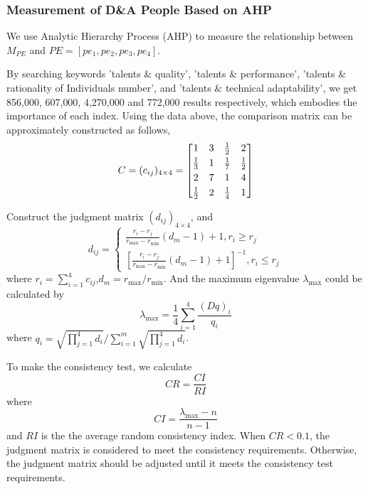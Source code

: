 \documentclass{mcmthesis}
\begin{document}
\subsubsection{Measurement of D\&A People Based on AHP}
We use Analytic Hierarchy Process (AHP) to measure the relationship between $M_{PE}$ and $PE = [pe_1,pe_2,pe_3,pe_4]$.

By searching keywords 'talents \& quality', 'talents \& performance', 'talents \& rationality of Individuals number', and 'talents \& technical adaptability', we get 856{,}000, 607{,}000, 4{,}270{,}000 and 772{,}000 results respectively, which embodies the importance of each index. Using the data above, the comparison matrix can be approximately constructed as follows,
\begin{equation}
    \setlength{\arraycolsep}{5pt}
    C = (c_{ij})_{4 \times 4} = \begin{bmatrix}
    1 & 3 & \frac{1}{2} & 2\\[1mm]
    \frac{1}{3} & 1 & \frac{1}{7} & \frac{1}{2} \\[1mm]
    2 & 7 & 1 & 4 \\[1mm]
    \frac{1}{2} & 2 & \frac{1}{4} & 1 \\
    \end{bmatrix}
\end{equation}

Construct the judgment matrix $(d_{ij})_{4 \times 4}$, and
\begin{equation}
d_{ij} = \begin{cases}
\frac{r_i-r_j}{r_{\max}-r_{\min}}(d_m-1)+1, r_i \geq r_j \\[2mm]
[\frac{r_i-r_j}{r_{\max}-r_{\min}}(d_m-1)+1]^{-1}, r_i \leq r_j 
\end{cases}
\end{equation}
where $r_i=\sum_{i=1}^4 c_{ij}$,$d_m = r_{\max} / r_{\min}$. And the maximum eigenvalue $\lambda_{\max}$ could be calculated by
\begin{equation}
    \lambda_{\max} = \frac{1}{4} \sum_{i=1}^4 \frac{(Dq)_i}{q_i}
\end{equation}
where $q_i = \sqrt{\prod_{j=1}^4 d_i}/ \sum_{i=1}^m \sqrt{\prod_{j=1}^4 d_i}$.

To make the consistency test, we calculate
\begin{equation}
    CR = \frac{CI}{RI}
\end{equation}
where 
\begin{equation}
    CI = \frac{\lambda_{\max}-n}{n-1}
\end{equation}
and $RI$ is the the average random consistency index. When $CR < 0.1$, the judgment matrix is considered to meet the consistency requirements. Otherwise, the judgment matrix should be adjusted until it meets the consistency test requirements\cite{3}.
\end{document}
